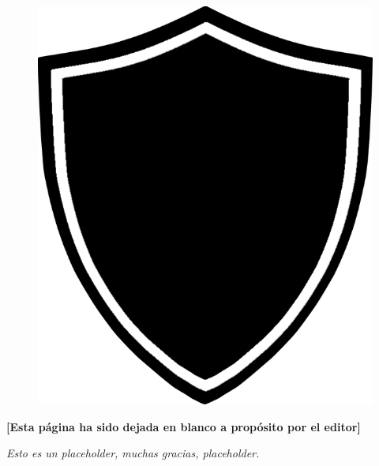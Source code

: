\documentclass[a4paper]{article}
\title{\textbf{\Huge{\titulo}}}
\author{\LARGE{\autor}\\ \\ \Large{\organizacion}}
\begin{document}
\maketitle

\begin{figure}[H]
    \center
    \includegraphics[width=.5\linewidth]{escudo}
\end{figure}
\newpage
\begin{center}
\textbf{[Esta página ha sido dejada en blanco a propósito por el editor]}
\end{center}
\newpage
\begin{flushright}
\textit{Esto es un placeholder, muchas gracias, placeholder.}
\end{flushright}
\newpage %
\end{document}

